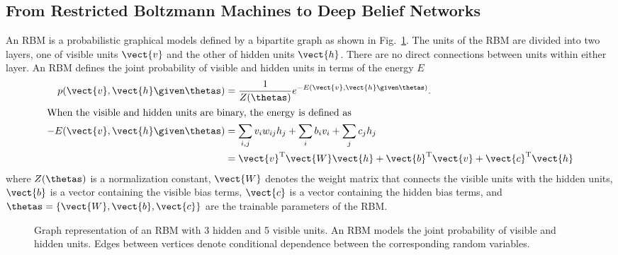 \subsection{From Restricted Boltzmann Machines to Deep Belief Networks}


An RBM is a probabilistic graphical models defined by a bipartite graph as shown
in Fig.~\ref{fig:rbm}. The units of the RBM are divided into two layers, one of
visible units $\vect{v}$ and the other of hidden units $\vect{h}$. There are no
direct connections between units within either layer. An RBM defines the joint
probability of visible and hidden units in terms of the energy $E$
\begin{align}
p(\vect{v}, \vect{h} \given \thetas) &=
\frac{1}{Z(\thetas)}e^{-E(\vect{v}, \vect{h} \given \thetas)}. \\
\intertext{When the visible and hidden units are binary, the energy is defined
as} 
-E(\vect{v}, \vect{h}\given \thetas) &= \sum_{i, j}v_i w_{ij} h_j +
\sum_i b_i v_i + \sum_j c_j h_j \\
&= \vect{v}^\textup{T}\vect{W}\vect{h} + \vect{b}^\textup{T}\vect{v} +
\vect{c}^\textup{T}\vect{h}
\end{align}
where $Z(\thetas)$ is a normalization constant, $\vect{W}$ denotes the weight
matrix that connects the visible units with the hidden units, $\vect{b}$ is a
vector containing the visible bias terms, $\vect{c}$ is a vector containing the
hidden bias terms, and $\thetas = \{\vect{W}, \vect{b}, \vect{c}\}$ are the
trainable parameters of the RBM.

\begin{figure}
\centering


\caption[Graph representation of an RBM with 3 hidden and 5 visible units]{%
Graph representation of an RBM with 3 hidden and 5 visible units.
An RBM models the joint probability of visible and hidden units. Edges between
vertices denote conditional dependence between the corresponding random
variables.}
  
\label{fig:rbm}
\end{figure}

